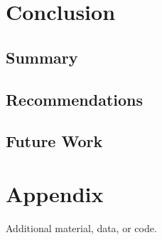 \documentclass[12pt,a4paper]{report}
\begin{document}
\chapter{Conclusion}
\section{Summary}
\section{Recommendations}
\section{Future Work}




\appendix
\chapter{Appendix}
Additional material, data, or code.
\end{document}
